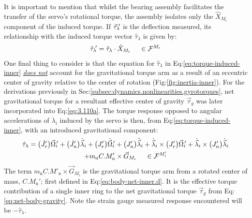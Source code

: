 \par
It is important to mention that whilst the bearing assembly facilitates the transfer of the servo's rotational torque, the assembly isolates only the $\hat{X}_{M_i}$ component of the induced torque. If $\vec{\tau}_{\lambda}\text{}\hspace{-2pt}'$ is the deflection measured, its relationship with the induced torque vector $\hat{\tau}_{\lambda}$ is given by:
\begin{equation}
\hat{\tau}_{\lambda}\text{}\hspace{-2pt}'=\hat{\tau}_{\lambda}\cdot\hat{X}_{M_i}~~~~\in\mathcal{F}^{M_i}
\end{equation}
One final thing to consider is that the equation for $\hat{\tau}_\lambda$ in Eq:\ref{eq:torque-induced-inner} \underline{\emph{does not}} account for the gravitational torque arm as a result of an eccentric center of gravity relative to the center of rotation (Fig:\ref{fig:inertia-inner}). For the derivations previously in Sec:\ref{subsec:dynamics.nonlinearities.gyrotorques}, net gravitational torque for a resultant effective center of gravity $\vec{\tau}_g$ was later incorporated into Eq:\ref{eq:3.110a}. The torque response opposed to angular accelerations of $\ddot{\lambda}_i$ induced by the servo is then, from Eq:\ref{eq:torque-induced-inner}, with an introduced gravitational component:
\begin{multline}\label{eq:model-inner}
\hat{\tau}_\lambda=\big(\dot{J}_{r}'\big)\vec{\Omega}_i\text{}\hspace{-2pt}'+\big(\dot{J}_{n}'\big)\dot{\vec{\lambda}}_i+\big(J_r'\big)\dot{\vec{\Omega}}_i\text{}\hspace{-2pt}'+\big(J_{n}'\big)\ddot{\vec{\lambda}}_i+\dot{\vec{\lambda}}_i\times \big(J_r'\big)\vec{\Omega}_i\text{}\hspace{-2pt}'+\dot{\vec{\lambda}}_i\times \big(J_{n}'\big)\dot{\vec{\lambda}}_i
\\
+m_\text{n}C.M'_{\text{n}}\times\vec{G}_{M_i}~~~~\in\mathcal{F}^{M_i'}
\end{multline}
The term $m_\text{n}C.M'_{\text{n}}\times\vec{G}_{M_i}$ is the gravitational torque arm from a rotated center of mass, $C.M_{\text{n}}'$; first defined in Eq:\ref{eq:body-net-inner.d}. It is the effective torque contribution of a single inner ring to the net gravitational torque $\vec{\tau}_g$ from Eq:\ref{eq:net-body-gravity}. Note the strain gauge measured response encountered will be $-\hat{\tau}_\lambda$.
\par
